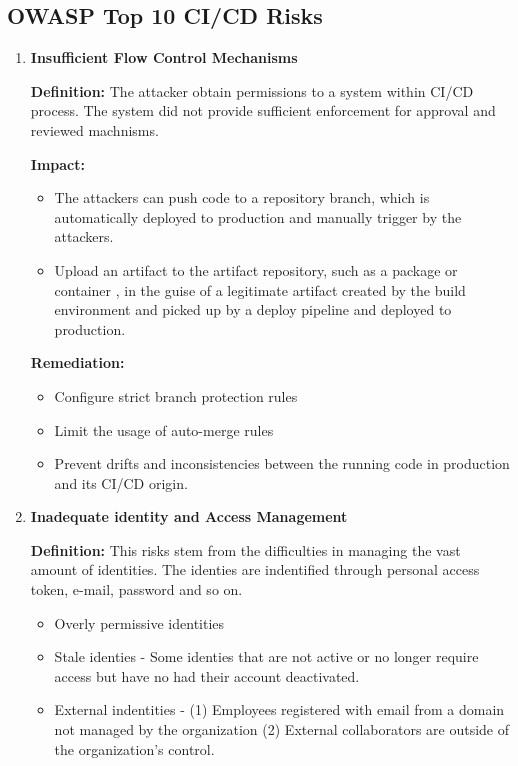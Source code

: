 \subsection{OWASP Top 10 CI/CD Risks\cite{OWASP2023}}
\begin{enumerate}[label=(\arabic*)]
    \item \textbf{Insufficient Flow Control Mechanisms}
    
    \textbf{Definition: }The attacker obtain permissions to a system within CI/CD process.
    The system did not provide sufficient enforcement for approval and reviewed machnisms.

    \textbf{Impact: }
        \begin{itemize}
            \item The attackers can push code to a repository branch, which is automatically
            deployed to production and manually trigger by the attackers.
            \item Upload an artifact to the artifact repository, such as a package or container
            , in the guise of a legitimate artifact created by the build environment and picked 
            up by a deploy pipeline and deployed to production.
        \end{itemize}
    
    \textbf{Remediation:}
    \begin{itemize}
        \item Configure strict branch protection rules
        \item Limit the usage of auto-merge rules
        \item Prevent drifts and inconsistencies between the running code in production and its 
        CI/CD origin.
    \end{itemize}
    \item \textbf{Inadequate identity and Access Management}
    
    \textbf{Definition: }This risks stem from the difficulties in managing the vast amount of
    identities. The identies are indentified through personal access token, e-mail, password and so on.
        \begin{itemize}
            \item Overly permissive identities
            \item Stale identies - Some identies that are not active or no longer require access but have
            no had their account deactivated.
            \item External indentities - (1) Employees registered with email from a domain not managed by 
            the organization (2) External collaborators are outside of the organization's control.
        \end{itemize}


\end{enumerate}
